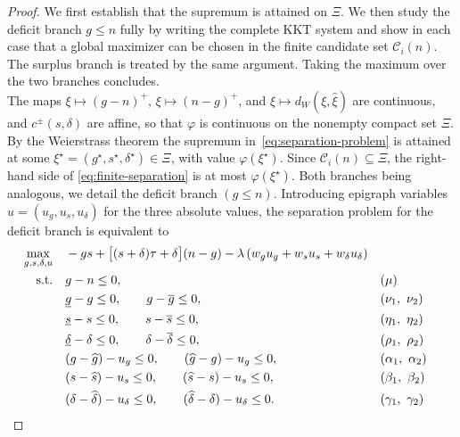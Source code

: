 \documentclass[11pt]{article}
\newcommand{\XiSet}{\Xi}
\newcommand{\hxi}{\widehat\xi}
\theoremstyle{plain}
\theoremstyle{definition}
\begin{document}
\begin{proof}
We first establish that the supremum is attained on $\XiSet$.
We then study the deficit branch $g\le n$ fully by writing the complete KKT system and show in each case that a global maximizer can be chosen in the finite candidate set $\mathcal C_i(n)$.
The surplus branch is treated by the same argument.
Taking the maximum over the two branches concludes.
\\

\noindent The maps $\xi\mapsto(g-n)^+$, $\xi\mapsto(n-g)^+$, and $\xi\mapsto d_W(\xi,\hxi)$ are continuous, and $c^\pm(s,\delta)$ are affine, so that $\varphi$ is continuous on the nonempty compact set $\XiSet$. 
By the Weierstrass theorem the supremum in~\eqref{eq:separation-problem} is attained at some $\xi^\star=(g^\star,s^\star,\delta^\star)\in\XiSet$, with value $\varphi(\xi^\star)$. 
Since $\mathcal C_i(n)\subseteq\XiSet$, the right-hand side of \eqref{eq:finite-separation} is at most $\varphi(\xi^\star)$.
Both branches being analogous, we detail the deficit branch $(g\le n)$.
Introducing epigraph variables $u=(u_g,u_s,u_\delta)$ for the three absolute values, the separation problem for the deficit branch is equivalent to
\begin{equation}
\label{eq:deficit-epigraph}
\begin{aligned}
    \max_{g,s,\delta,u}
    \quad
    &
    -gs
    +
    \bigl[(s+\delta)\tau+\delta\bigr](n-g)
    -
    \lambda
    \left(
        w_g u_g
        +
        w_s u_s
        +
        w_\delta u_\delta
    \right)
    \\
    \textnormal{s.t.}\quad
    &
    g-n\le0,
    &&
    (\mu)
    \\
    &
    \underline g-g\le0,
    \qquad
    g-\overline g\le0,
    &&
    (\nu_1,\ \nu_2)
    \\
    &
    \underline s-s\le0,
    \qquad
    s-\overline s\le0,
    &&
    (\eta_1,\ \eta_2)
    \\
    &
    \underline\delta-\delta\le0,
    \qquad
    \delta-\overline\delta\le0,
    &&
    (\rho_1,\ \rho_2)
    \\
    &
    (g-\widehat g)-u_g\le0,
    \qquad
    (\widehat g-g)-u_g\le0,
    &&
    (\alpha_1,\ \alpha_2)
    \\
    &
    (s-\widehat s)-u_s\le0,
    \qquad
    (\widehat s-s)-u_s\le0,
    &&
    (\beta_1,\ \beta_2)
    \\
    &
    (\delta-\widehat\delta)-u_\delta\le0,
    \qquad
    (\widehat\delta-\delta)-u_\delta\le0.
    &&
    (\gamma_1,\ \gamma_2)
\end{aligned}
\end{equation}       


\end{proof}
\end{document}
